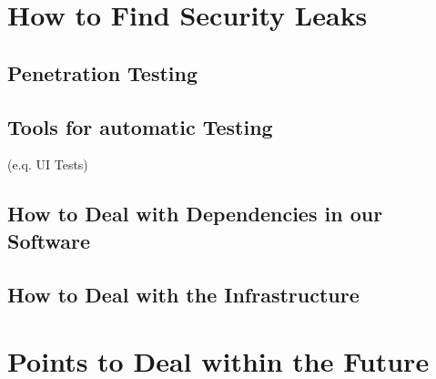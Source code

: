 


\section{How to Find Security Leaks}


\subsection{Penetration Testing}


\subsection{Tools for automatic Testing}
(e.q. UI Tests)


\subsection{How to Deal with Dependencies in our Software}
\subsection{How to Deal with the Infrastructure}
\section{Points to Deal within the Future}
